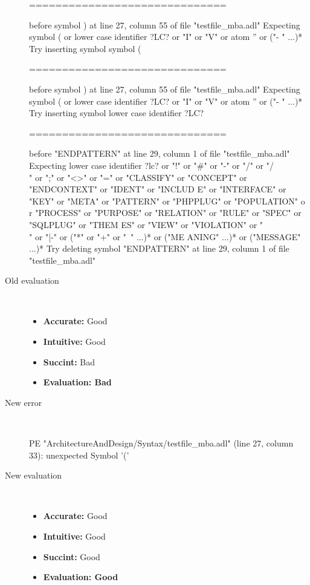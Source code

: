 \begin{description}
\begin{haskell}
==============================

before symbol ) at line 27, column 55 of file "testfile_mba.adl"
Expecting symbol ( or lower case identifier ?LC? or "I" or "V" or atom '' or ("-
" ...)*
Try inserting symbol symbol (

==============================

before symbol ) at line 27, column 55 of file "testfile_mba.adl"
Expecting symbol ( or lower case identifier ?LC? or "I" or "V" or atom '' or ("-
" ...)*
Try inserting symbol lower case identifier ?LC?

==============================

before "ENDPATTERN" at line 29, column 1 of file "testfile_mba.adl"
Expecting lower case identifier ?lc? or "!" or "#" or "-" or "/" or "/\\" or ";"
 or "<>" or "=" or "CLASSIFY" or "CONCEPT" or "ENDCONTEXT" or "IDENT" or "INCLUD
E" or "INTERFACE" or "KEY" or "META" or "PATTERN" or "PHPPLUG" or "POPULATION" o
r "PROCESS" or "PURPOSE" or "RELATION" or "RULE" or "SPEC" or "SQLPLUG" or "THEM
ES" or "VIEW" or "VIOLATION" or "\\" or "|-" or ("*" or "+" or "~" ...)* or ("ME
ANING" ...)* or ("MESSAGE" ...)*
Try deleting symbol "ENDPATTERN" at line 29, column 1 of file "testfile_mba.adl"
\end{haskell}
  \item[Old evaluation]~\\
    \begin{itemize}
    \item \textbf{Accurate:} Good
    \item \textbf{Intuitive:} Good
    \item \textbf{Succint:} Bad
    \item \textbf{Evaluation: Bad}
    \end{itemize}
  \item[New error]~\\
\begin{haskell}
PE "ArchitectureAndDesign/Syntax/testfile_mba.adl" (line 27, column 33):
unexpected Symbol '('\end{haskell}
  \item[New evaluation]~\\
    \begin{itemize}
    \item \textbf{Accurate:} Good
    \item \textbf{Intuitive:} Good
    \item \textbf{Succint:} Good
    \item \textbf{Evaluation: Good
}
    \end{itemize}
  \end{description}

